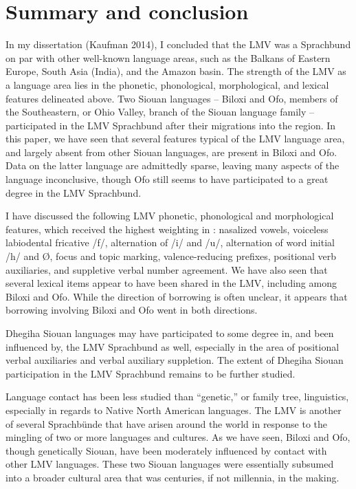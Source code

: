 \documentclass[output=paper]{LSP/langsci}
\begin{document}
\section{Summary and conclusion}
	
In my dissertation (Kaufman 2014), I concluded that the LMV was a Sprachbund on par with other well-known language areas, such as the Balkans of Eastern Europe, South Asia (India), and the Amazon basin. The strength of the LMV as a language area lies in the phonetic, phonological, morphological, and lexical features delineated above. Two Siouan languages -- Biloxi and Ofo, members of the Southeastern, or Ohio Valley, branch of the Siouan language family -- participated in the LMV Sprachbund after their migrations into the region. In this paper, we have seen that several features typical of the LMV language area, and largely absent from other Siouan languages, are present in Biloxi and Ofo. Data on the latter language are admittedly sparse, leaving many aspects of the language inconclusive, though Ofo still seems to have participated to a great degree in the LMV Sprachbund. 

I have discussed the following LMV phonetic, phonological and morphological features, which received the highest weighting in \citet{Kaufman2014}: nasalized vowels, voiceless labiodental fricative /f/, alternation of /i/ and /u/, alternation of word initial /h/ and Ø, focus and topic marking, valence-reducing prefixes, positional verb auxiliaries, and suppletive verbal number agreement. We have also seen that several lexical items appear to have been shared in the LMV, including among Biloxi and Ofo. While the direction of borrowing is often unclear, it appears that borrowing involving Biloxi and Ofo went in both directions.

Dhegiha Siouan languages may have participated to some degree in, and been influenced by, the LMV Sprachbund as well, especially in the area of positional verbal auxiliaries and verbal auxiliary suppletion. The extent of Dhegiha Siouan participation in the LMV Sprachbund remains to be further studied.

Language contact has been less studied than “genetic,” or family tree, linguistics, especially in regards to Native North American languages. The LMV is another of several Sprachbünde that have arisen around the world in response to the mingling of two or more languages and cultures. As we have seen, Biloxi and Ofo, though genetically Siouan, have been moderately influenced by contact with other LMV languages. These two Siouan languages were essentially subsumed into a broader cultural area that was centuries, if not millennia, in the making. 
\end{document}
